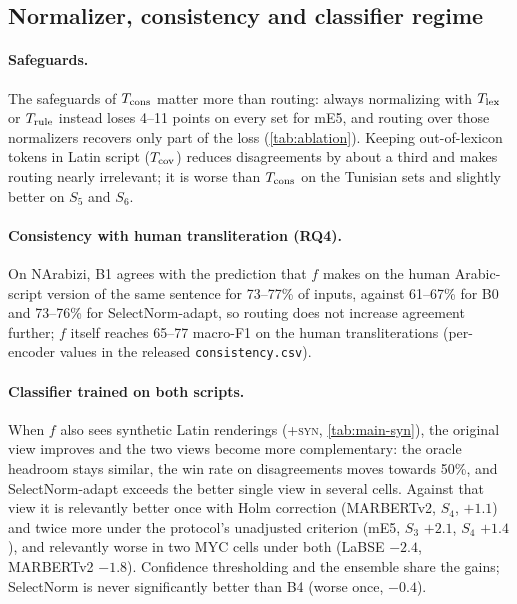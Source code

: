 \subsection{Normalizer, consistency and classifier regime}
\paragraph{Safeguards.} The safeguards of $T_{\rm cons}$ matter more than routing: always normalizing with $T_{\rm lex}$ or $T_{\rm rule}$ instead loses 4--11 points on every set for mE5, and routing over those normalizers recovers only part of the loss (\cref{tab:ablation}). Keeping out-of-lexicon tokens in Latin script ($T_{\rm cov}$) reduces disagreements by about a third and makes routing nearly irrelevant; it is worse than $T_{\rm cons}$ on the Tunisian sets and slightly better on $S_5$ and $S_6$.

\paragraph{Consistency with human transliteration (RQ4).} On NArabizi, B1 agrees with the prediction that $f$ makes on the human Arabic-script version of the same sentence for 73--77\% of inputs, against 61--67\% for B0 and 73--76\% for SelectNorm-adapt, so routing does not increase agreement further; $f$ itself reaches 65--77 macro-F1 on the human transliterations (per-encoder values in the released \texttt{consistency.csv}).

\paragraph{Classifier trained on both scripts.} When $f$ also sees synthetic Latin renderings (\textsc{+syn}, \cref{tab:main-syn}), the original view improves and the two views become more complementary: the oracle headroom stays similar, the win rate on disagreements moves towards 50\%, and SelectNorm-adapt exceeds the better single view in several cells. Against that view it is relevantly better once with Holm correction (MARBERTv2, $S_4$, $+1.1$) and twice more under the protocol's unadjusted criterion (mE5, $S_3$ $+2.1$, $S_4$ $+1.4$), and relevantly worse in two MYC cells under both (LaBSE $-2.4$, MARBERTv2 $-1.8$). Confidence thresholding and the ensemble share the gains; SelectNorm is never significantly better than B4 (worse once, $-0.4$).
